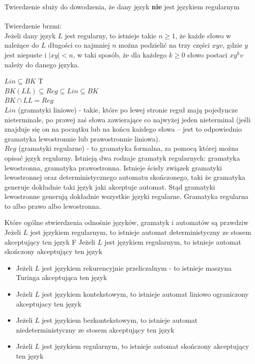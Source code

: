 Twierdzenie służy do dowodzenia, że dany język \textbf{nie} jest językiem regularnym\\\\
Twierdzenie brzmi:\\
Jeżeli dany język $L$ jest regularny, to istnieje takie $n \geq 1$, że każde słowo w należące do $L$ długości co najmniej $n$ można podzielić na trzy części $xyv$, gdzie $y$ jest niepuste i $|xy| < n$, w taki sposób, że dla każdego $k \geq 0$ słowo postaci $xy^kv$ należy do danego języka.

{$Lin \subseteq BK$}
{T}
{}
{\\$BK(LL) \subseteq Reg \subseteq Lin \subseteq BK$\\
	$BK \cap LL = Reg$\\
	\newline
	$Lin$ (gramatyki liniowe) - takie, które po lewej stronie reguł mają pojedyncze nieterminale, po prawej zaś słowa zawierające co najwyżej jeden nieterminal (jeśli znajduje się on na początku lub na końcu każdego słowa – jest to odpowiednio gramatyka lewostronnie lub prawostronnie liniowa).\\
	\newline
	$Reg$ (gramatyki regularne) - to gramatyka formalna, za pomocą której można opisać język regularny. Istnieją dwa rodzaje gramatyk regularnych: gramatyka lewostronna, gramatyka prawostronna. Istnieje ścisły związek gramatyki lewostronnej oraz deterministycznego automatu skończonego, taki że gramatyka generuje dokładnie taki język jaki akceptuje automat. Stąd gramatyki lewostronne generują dokładnie wszystkie języki regularne. Gramatyka regularna to albo prawo albo lewostronna.}

\answer
{Które ogólne stwierdzenia odnośnie języków, gramatyk i automatów są prawdziw}
{Jeżeli $L$ jest językiem regularnym, to istnieje automat deterministyczny ze stosem akceptujący ten język }
{F}
{Jeżeli $L$ jest językiem regularnym, to istnieje automat skończony akceptujący ten język}
{
	\begin{itemize}
		\item Jeżeli $L$ jest językiem rekurencyjnie przeliczalnym - to istnieje maszyna Turinga akceptująca ten język
		\item Jeżeli $L$ jest językiem kontekstowym, to istnieje automat liniowo ograniczony akceptujacy ten język
		\item Jeżeli $L$ jest językiem bezkontekstowym, to istnieje automat niedeterministyczny ze stosem akceptujący ten język
		\item Jeżeli $L$ jest językiem regularnym, to istnieje automat skończony akceptujący ten język
	\end{itemize}
}

